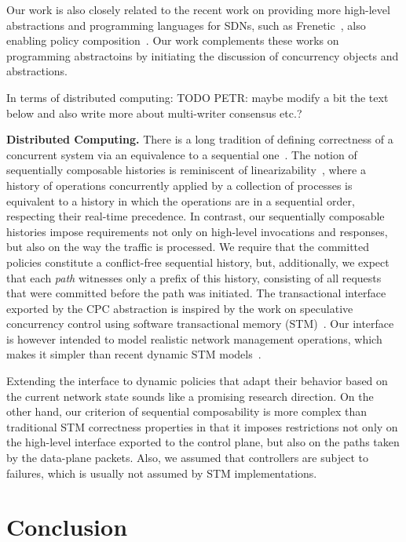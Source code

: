 \documentclass[conference]{sigcomm-alternate}
\begin{document}
Our work is also closely related to the recent work on providing more high-level
abstractions and programming languages for SDNs, such as Frenetic~\cite{frenetic},
also enabling policy composition~\cite{pyretic}. Our work complements these works
on programming abstractoins
by initiating the discussion of concurrency objects and abstractions.

In terms of distributed computing: TODO PETR: maybe modify a bit the text below
and also write more about multi-writer consensus etc.?

\noindent\textbf{Distributed Computing.}
There is a long tradition of defining correctness of a concurrent system via
an equivalence to a sequential one~\cite{Pap79-serial,Lam79,HW90}.  The notion
of sequentially composable histories is reminiscent of
linearizability~\cite{HW90}, where a history of operations concurrently
applied by a collection of processes is equivalent to a history in which the
operations are in a sequential order, respecting their real-time precedence.
In contrast, our sequentially composable histories impose requirements not
only on high-level invocations and responses, but also on the way the traffic
is processed. We require that the committed policies constitute a
conflict-free sequential history, but, additionally,  we expect that each
\emph{path} witnesses only a prefix of this history, consisting of all
requests that were committed before the path was initiated.
%
The transactional interface exported by the CPC abstraction is inspired by the
work on speculative concurrency control using software transactional memory
(STM)~\cite{stm-st95}.
Our interface is however intended to model realistic network
management operations, which makes it simpler than recent
dynamic STM models~\cite{dstm}.

Extending the interface to dynamic policies that adapt their behavior based on
the current network state sounds like a promising research direction.  On the
other hand, our criterion of sequential composability is more complex than
traditional STM correctness properties in that it imposes restrictions not only
on the high-level interface exported to the control plane, but also on the
paths taken by the data-plane packets.
Also, we assumed that controllers are subject to failures, which is usually not
assumed by STM implementations.


\section{Conclusion}\label{sec:conclusion}
\end{document}
